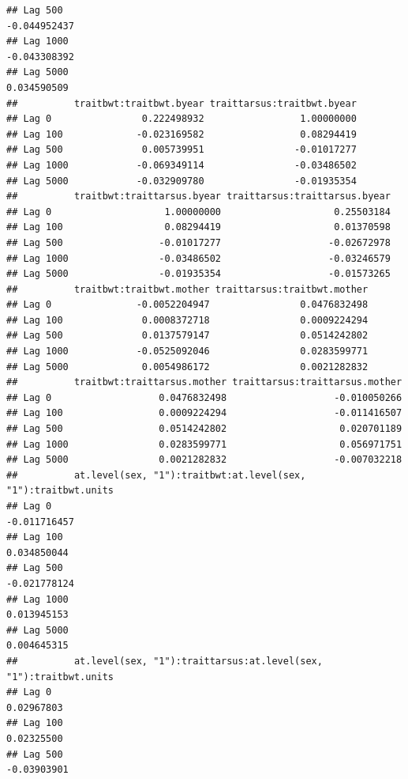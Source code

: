 \documentclass[
  12pt,
]{book}
\begin{document}
\begin{verbatim}
## Lag 500                                                          -0.044952437
## Lag 1000                                                         -0.043308392
## Lag 5000                                                          0.034590509
##          traitbwt:traitbwt.byear traittarsus:traitbwt.byear
## Lag 0                0.222498932                 1.00000000
## Lag 100             -0.023169582                 0.08294419
## Lag 500              0.005739951                -0.01017277
## Lag 1000            -0.069349114                -0.03486502
## Lag 5000            -0.032909780                -0.01935354
##          traitbwt:traittarsus.byear traittarsus:traittarsus.byear
## Lag 0                    1.00000000                    0.25503184
## Lag 100                  0.08294419                    0.01370598
## Lag 500                 -0.01017277                   -0.02672978
## Lag 1000                -0.03486502                   -0.03246579
## Lag 5000                -0.01935354                   -0.01573265
##          traitbwt:traitbwt.mother traittarsus:traitbwt.mother
## Lag 0               -0.0052204947                0.0476832498
## Lag 100              0.0008372718                0.0009224294
## Lag 500              0.0137579147                0.0514242802
## Lag 1000            -0.0525092046                0.0283599771
## Lag 5000             0.0054986172                0.0021282832
##          traitbwt:traittarsus.mother traittarsus:traittarsus.mother
## Lag 0                   0.0476832498                   -0.010050266
## Lag 100                 0.0009224294                   -0.011416507
## Lag 500                 0.0514242802                    0.020701189
## Lag 1000                0.0283599771                    0.056971751
## Lag 5000                0.0021282832                   -0.007032218
##          at.level(sex, "1"):traitbwt:at.level(sex, "1"):traitbwt.units
## Lag 0                                                     -0.011716457
## Lag 100                                                    0.034850044
## Lag 500                                                   -0.021778124
## Lag 1000                                                   0.013945153
## Lag 5000                                                   0.004645315
##          at.level(sex, "1"):traittarsus:at.level(sex, "1"):traitbwt.units
## Lag 0                                                          0.02967803
## Lag 100                                                        0.02325500
## Lag 500                                                       -0.03903901

\end{verbatim}
\end{document}
